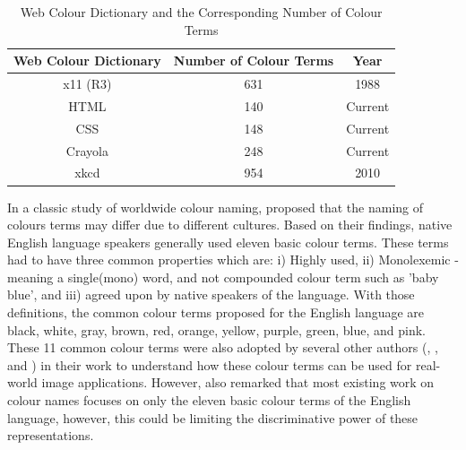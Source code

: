 \begin{table}[hbt!]
 \centering
 \begin{tabular}{|c|c|c|} \hline
 \multicolumn{1}{|c|}{\textbf{Web Colour Dictionary}} &
 \multicolumn{1}{c|}{\textbf{Number of Colour Terms}} &
 \multicolumn{1}{c|}{\textbf{Year}} \\ \hline x11 (R3)
 & 631                         & 1988
 \\ \hline HTML                        & 140
 & Current              \\ \hline CSS
 & 148                         & Current
 \\ \hline Crayola                       & 248
 & Current              \\ \hline xkcd
 & 954                         & 2010
 \\ \hline
 \end{tabular}
 \caption[Web Colour Dictionary and the Corresponding Number of Colour Terms]
 {Web Colour Dictionary and the Corresponding Number of Colour Terms}
\label{table:allcolourterms}
\end{table}



In a classic study of worldwide colour naming,  proposed
that the naming of colours terms may differ due to different cultures. Based on
their findings, native English language speakers generally used eleven basic
colour terms. These terms had to have three common properties which are: i)
Highly used, ii) Monolexemic - meaning a single(mono) word, and not compounded
colour term such as 'baby blue', and iii) agreed upon by native speakers of the
language. With those definitions, the common colour terms proposed for the
English language are black, white, gray, brown, red, orange, yellow, purple,
green, blue, and pink. These 11 common colour terms were also adopted by
several other authors (, ,
and ) in their work to understand how these colour
terms can be used for real-world image applications.
However,  also remarked that most existing work on colour
names focuses on only the eleven basic colour terms of the English language,
however, this could be limiting the discriminative power of these
representations.


